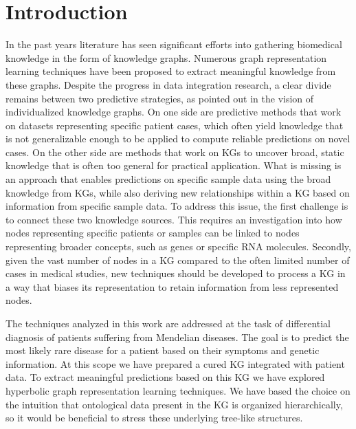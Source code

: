 \chapter{Introduction}

In the past years literature has seen significant efforts into gathering biomedical knowledge in the form of knowledge graphs. Numerous graph representation learning techniques have been proposed to extract meaningful knowledge from these graphs. Despite the progress in data integration research, a clear divide remains between two predictive strategies, as pointed out in the vision of individualized knowledge graphs\cite{PingPeipei2017IKGA}. On one side are predictive methods that work on datasets representing specific patient cases, which often yield knowledge that is not generalizable enough to be applied to compute reliable predictions on novel cases. On the other side are methods that work on KGs to uncover broad, static knowledge that is often too general for practical application. What is missing is an approach that enables predictions on specific sample data using the broad knowledge from KGs, while also deriving new relationships within a KG based on information from specific sample data. To address this issue, the first challenge is to connect these two knowledge sources. This requires an investigation into how nodes representing specific patients or samples can be linked to nodes representing broader concepts, such as genes or specific RNA molecules. Secondly, given the vast number of nodes in a KG compared to the often limited number of cases in medical studies, new techniques should be developed to process a KG in a way that biases its representation to retain information from less represented nodes.

The techniques analyzed in this work are addressed at the task of differential diagnosis of patients suffering from Mendelian diseases. The goal is to predict the most likely rare disease for a patient based on their symptoms and genetic information. At this scope we have prepared a cured KG integrated with patient data. To extract meaningful predictions based on this KG we have explored hyperbolic graph representation learning techniques. We have based the choice on the intuition that ontological data present in the KG is organized hierarchically, so it would be beneficial to stress these underlying tree-like structures.

\newpage
